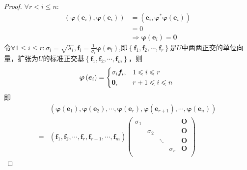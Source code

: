 {\begin{proof}
        $\forall r<i\leqslant n:$
        \begin{align*}
            \left(
            \bm{\varphi}\left(
                \bm{e}_i
                \right),\bm{\varphi}\left(
                \bm{e}_i
                \right)
            \right) & =\left(
            \bm{e}_i,\bm{\varphi}^*\bm{\varphi}\left(
                \bm{e}_i
                \right)
            \right)                                     \\
                    & =0                                \\
                    & \Longrightarrow\bm{\varphi}\left(
            \bm{e}_i
            \right)=\bm{0}
        \end{align*}令$\displaystyle\forall1\leqslant i\leqslant r:\sigma_i=\sqrt{\lambda_i},\bm{f}_i=\frac{1}{\sigma_i}\bm{\varphi}\left(\bm{e}_i\right)$,即$\left\{
            \bm{f}_1,\bm{f}_2,\cdots,\bm{f}_r
            \right\}$是$U$中两两正交的单位向量，扩张为$U$的标准正交基$\left\{
            \bm{f}_1,\bm{f}_2,\cdots,\bm{f}_m
            \right\}$，则\[
            \bm{\varphi}\left(\bm{e}_i\right)=\begin{cases*}
                \sigma_i\bm{f}_i, & $1\leqslant i\leqslant r$   \\
                \bm{0},           & $r+1\leqslant i\leqslant n$
            \end{cases*}
        \]即\begin{align*}
              & \left(
            \bm{\varphi}\left(
                \bm{e}_1
                \right),\bm{\varphi}\left(
                \bm{e}_2
                \right)
            ,\cdots,\bm{\varphi}\left(
                \bm{e}_r
                \right),\bm{\varphi}\left(
                \bm{e}_{r+1}
                \right),\cdots,\bm{\varphi}\left(
                \bm{e}_n
                \right)
            \right)    \\
            = & \left(
            \bm{f}_1,\bm{f}_2,\cdots,\bm{f}_r,\bm{f}_{r+1},\cdots,\bm{f}_m
            \right)\begin{pmatrix}
                       \sigma_1 &          &        &          & \bm{O} \\
                                & \sigma_2 &        &          & \bm{O} \\
                                &          & \ddots &          & \bm{O} \\
                                &          &        & \sigma_r & \bm{O} \\

\end{pmatrix}
\end{align*}
\end{proof}}
